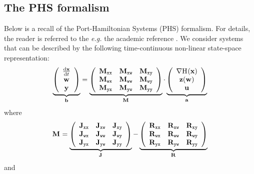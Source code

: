 \documentclass[10pt,a4paper]{article}
\begin{document}
\subsection{The PHS formalism}
%
Below is a recall of the Port-Hamiltonian Systems (PHS) formalism.
%
For details, the reader is referred to the \textit{e.g.} the academic reference \cite{falaize2016apassive}.
%
%
We consider systems that can be described by the following time-continuous non-linear state-space representation:
%
%
\begin{equation}
\underbrace{\left(
\begin{array}{c}
\D{\vx}{t}\\
\vw\\
\vy
\end{array}
\right)}_{\vec b}
=
\underbrace{\left(\begin{array}{lll}
\M{xx}&\M{xw} & \M{xy}\\ 
\M{wx}&\M{ww} & \M{wy}\\ 
\M{yx}&\M{yw} & \M{yy}
\end{array}\right)}_{\M{}}
\cdot
\underbrace{\left(
\begin{array}{c}
\dxH{}(\vx)\\
\vz(\vw)\\
\vu
\end{array}
\right)
}_{\vec a}
\end{equation}
%
where 
\begin{equation}
\M{}
=
\underbrace{\left(\begin{array}{lll}
\J{xx}&\J{xw} & \J{xy}\\ 
\J{wx}&\J{ww} & \J{wy}\\ 
\J{yx}&\J{yw} & \J{yy}
\end{array}\right)}_{\J{}}
-
\underbrace{\left(\begin{array}{lll}
\R{xx}&\R{xw} & \R{xy}\\ 
\R{wx}&\R{ww} & \R{wy}\\ 
\R{yx}&\R{yw} & \R{yy}
\end{array}\right)}_{\R{}}
\end{equation}
%
and
%
\end{document}
